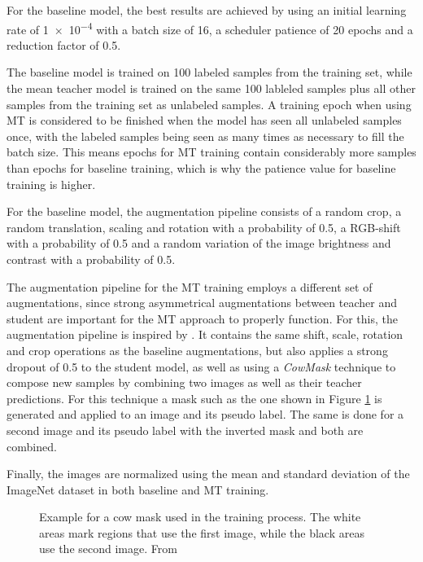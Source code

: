 For the baseline model, the best results are achieved by using an initial learning rate of \num{1e-4} with a batch size of 16, a scheduler patience of 20 epochs and a reduction factor of \num{0.5}. 

The baseline model is trained on 100 labeled samples from the training set, while the mean teacher model is trained on the same 100 lableled samples plus all other samples from the training set as unlabeled samples.
A training epoch when using MT is considered to be finished when the model has seen all unlabeled samples once, with the labeled samples being seen as many times as necessary to fill the batch size. This means epochs for MT training contain considerably more samples than epochs for baseline training, which is why the patience value for baseline training is higher.

For the baseline model, the augmentation pipeline consists of a random  crop, a random translation, scaling and rotation with a probability of \num{0.5}, a RGB-shift with a probability of \num{0.5} and a random variation of the image brightness and contrast with a probability of \num{0.5}.  

The augmentation pipeline for the MT training employs a different set of augmentations, since strong asymmetrical augmentations between teacher and student are important for the MT approach to properly function. For this, the augmentation pipeline is inspired by \cite{schererPseudoLabelNoiseSuppression2022}. It contains the same shift, scale, rotation and crop operations as the baseline augmentations, but also applies a strong dropout of \num{0.5} to the student model, as well as using a \emph{CowMask} technique to compose new samples by combining two images as well as their teacher predictions.
For this technique a mask such as the one shown in Figure \ref{fig:cowmask} is generated and applied to an image and its pseudo label. The same is done for a second image and its pseudo label with the inverted mask and both are combined.

Finally, the images are normalized using the mean and standard deviation of the ImageNet dataset in both baseline and MT training.

\begin{figure}[htbp]
    \centering
    \vspace{0.1cm}
    \caption{Example for a cow mask used in the training process. The white areas mark regions that use the first image, while the black areas use the second image. From \cite{schererPseudoLabelNoiseSuppression2022}}
    \label{fig:cowmask}
\end{figure}

